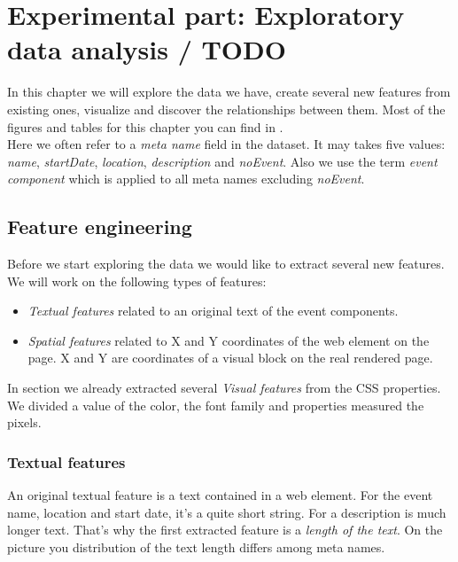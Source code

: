 \chapter{Experimental part: Exploratory data analysis / TODO}
\label{chap:dataexplore}
In this chapter we will explore the data we have, create several new features from existing ones, visualize and discover the relationships between them. Most of the figures and tables for this chapter you can find in .\\

Here we often refer to a \textit{meta name} field in the dataset. It may takes five values: \textit{name}, \textit{startDate}, \textit{location}, \textit{description} and \textit{noEvent}. Also we use the term \textit{event component} which is applied to all meta names excluding \textit{noEvent}.


\section{Feature engineering}
Before we start exploring the data we would like to extract several new features. We will work on the following types of features: 

\begin{itemize}
\item \textit{Textual features} related to an original text of the event components.
\item \textit{Spatial features} related to X and Y coordinates of the web element on the page. X and Y are coordinates of a visual block on the real rendered page. 
\end{itemize}

In section  we already extracted several \textit{Visual features} from the CSS properties. We divided a value of the color, the font family and properties measured the pixels. 

\subsection{Textual features}

An original textual feature is a text contained in a web element. For the event name, location and start date, it's a quite short string. For a description is much longer text. That's why the first extracted feature is a \textit{length of the text}. On the picture  you distribution of the text length differs among meta names. \\

